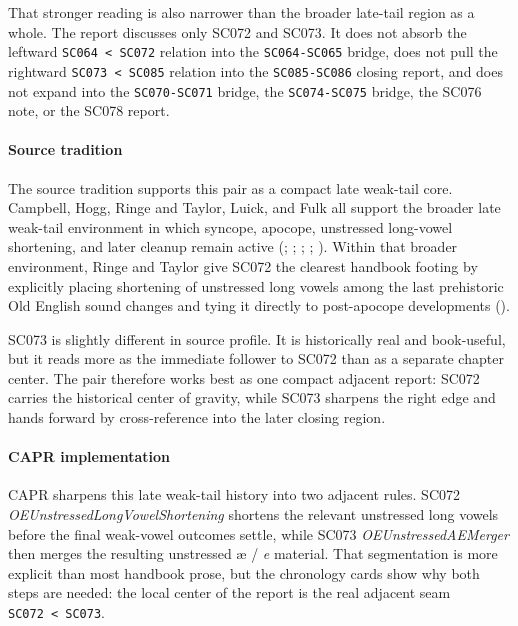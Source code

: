 \documentclass[
  british,
  a4paper,
]{article}
\begin{document}
That stronger reading is also narrower than the broader late-tail region
as a whole. The report discusses only SC072 and SC073. It does not
absorb the leftward \texttt{SC064\ \textless{}\ SC072} relation into the
\texttt{SC064-SC065} bridge, does not pull the rightward
\texttt{SC073\ \textless{}\ SC085} relation into the
\texttt{SC085-SC086} closing report, and does not expand into the
\texttt{SC070-SC071} bridge, the \texttt{SC074-SC075} bridge, the SC076
note, or the SC078 report.

\paragraph{Source tradition}\label{source-tradition-45}

The source tradition supports this pair as a compact late weak-tail
core. Campbell, Hogg, Ringe and Taylor, Luick, and Fulk all support the
broader late weak-tail environment in which syncope, apocope, unstressed
long-vowel shortening, and later cleanup remain active
(;
;
; ; ). Within that
broader environment, Ringe and Taylor give SC072 the clearest handbook
footing by explicitly placing shortening of unstressed long vowels among
the last prehistoric Old English sound changes and tying it directly to
post-apocope developments ().

SC073 is slightly different in source profile. It is historically real
and book-useful, but it reads more as the immediate follower to SC072
than as a separate chapter center. The pair therefore works best as one
compact adjacent report: SC072 carries the historical center of gravity,
while SC073 sharpens the right edge and hands forward by cross-reference
into the later closing region.

\paragraph{CAPR implementation}\label{capr-implementation-45}

CAPR sharpens this late weak-tail history into two adjacent rules. SC072
\emph{OEUnstressedLongVowelShortening} shortens the relevant unstressed
long vowels before the final weak-vowel outcomes settle, while SC073
\emph{OEUnstressedAEMerger} then merges the resulting unstressed æ /
\emph{e} material. That segmentation is more explicit than most handbook
prose, but the chronology cards show why both steps are needed: the
local center of the report is the real adjacent seam
\texttt{SC072\ \textless{}\ SC073}.
\end{document}
